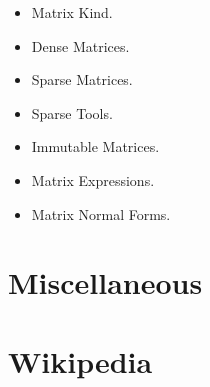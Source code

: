 \documentclass{article}
\begin{document}
\begin{itemize}
\begin{itemize}
\begin{verbatim}
			[\/ 6   -------  2*\/ 6 ]
			[          3            ]
			[                       ]
			[          ___          ]
			[        \/ 3           ]
			[  0     -----      0   ]
			[          3            ]
			[                       ]
			[                   ___ ]
			[  0       0      \/ 2  ]
			>>> Q*R
			[1  1  1]
			[       ]
			[1  1  3]
			[       ]
			[2  3  4]
		\end{verbatim}
		In addition to solvers in {\tt solver.py} file, can solve system $A{\bf x} = {\bf b}$ by passing vector ${\bf b}$ to matrix $A$'s {\tt LUsolve} function. Here cheat a little choose $A$ \& ${\bf x}$ then multiply to get ${\bf b}$. Then can solve for ${\bf x}$ \& check it's correct:
		\begin{verbatim}
			>>> A = Matrix([ [2, 3, 5], [3, 6, 2], [8, 3, 6] ])
			>>> x = Matrix(3,1,[3,7,5])
			>>> b = A*x
			>>> soln = A.LUsolve(b)
			>>> soln
			[3]
			[ ]
			[7]
			[ ]
			[5]
		\end{verbatim}
		***STOP HERE***
	\end{itemize}
	\item {\sf Matrix Kind.}
	\item {\sf Dense Matrices.}
	\item {\sf Sparse Matrices.}
	\item {\sf Sparse Tools.}
	\item {\sf Immutable Matrices.}
	\item {\sf Matrix Expressions.}
	\item {\sf Matrix Normal Forms.}
\end{itemize}


\section{Miscellaneous}



\section{Wikipedia}
\end{document}
